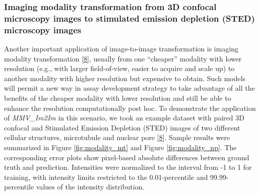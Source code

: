\hypertarget{imaging-modality-transformation-from-3d-confocal-microscopy-images-to-stimulated-emission-depletion-sted-microscopy-images}{%
\subsubsection{Imaging modality transformation from 3D confocal microscopy images to stimulated emission depletion (STED) microscopy images}\label{imaging-modality-transformation-from-3d-confocal-microscopy-images-to-stimulated-emission-depletion-sted-microscopy-images}}

Another important application of image-to-image transformation is imaging modality transformation {[}\protect\hyperlink{ref-UEBDZ3tI}{8}{]}, usually from one ``cheaper'' modality with lower resolution (e.g., with larger field-of-view, easier to acquire and scale up) to another modality with higher resolution but expensive to obtain. Such models will permit a new way in assay development strategy to take advantage of all the benefits of the cheaper modality with lower resolution and still be able to enhance the resolution computationally post hoc. To demonstrate the application of \emph{MMV\_Im2Im} in this scenario, we took an example dataset with paired 3D confocal and Stimulated Emission Depletion (STED) images of two different cellular structures, microtubule and nuclear pore {[}\protect\hyperlink{ref-UEBDZ3tI}{8}{]}. Sample results were summarized in Figure \ref{fig:modality_mt} and Figure \ref{fig:modality_np}. The corresponding error plots show pixel-based absolute differences between ground truth and prediction. Intensities were normalized to the interval from -1 to 1 for training, with intensity limits restricted to the 0.01-percentile and 99.99-percentile values of the intensity distribution.

